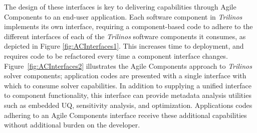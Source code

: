 \documentclass[pdf,ps2pdf,12pt,report]{SANDreport}
\theoremstyle{plain}
\theoremstyle{definition}
\theoremstyle{remark}
\numberwithin{equation}{section}
\begin{document}
The design of these interfaces is key to delivering capabilities through Agile Components to an end-user application. Each software component in \emph{Trilinos} implements its own interface, requiring a component-based code to adhere to the different interfaces of each of the \emph{Trilinos} software components it consumes, as depicted in Figure \ref{fig:ACInterfaces1}.  This increases time to deployment, and requires code to be refactored every time a component interface changes.   Figure~\ref{fig:ACInterfaces2} illustrates the Agile Components approach to \emph{Trilinos} solver components; application codes are presented with a single interface with which to consume solver capabilities.  In addition to supplying a unified interface to component functionality, this interface can provide metadata analysis utilities such as embedded UQ, sensitivity analysis, and optimization.  Applications codes adhering to an Agile Components interface receive these additional capabilities without additional burden on the developer.
\end{document}
